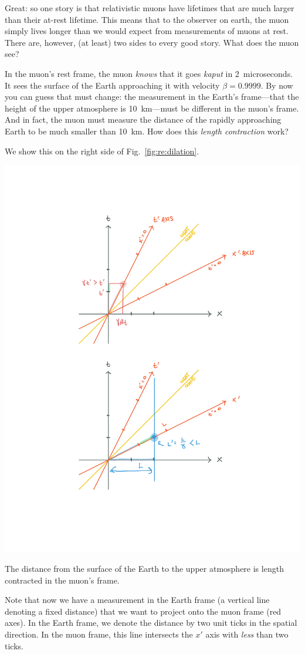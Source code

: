 Great: so one story is that relativistic muons have lifetimes that are much larger than their at-rest lifetime. This means that to the observer on earth, the muon simply lives longer than we would expect from measurements of muons at rest. There are, however, (at least) two sides to every good story. What does the muon see?

In the muon's rest frame, the muon \emph{knows} that it goes \emph{kaput} in 2~microseconds. It sees the surface of the Earth approaching it with velocity $\beta = 0.9999$. By now you can guess that must change: the measurement in the Earth's frame---that the height of the upper atmosphere is 10~km---must be different in the muon's frame. And in fact, the muon must measure the distance of the rapidly approaching Earth to be much smaller than 10~km. How does this \emph{length contraction} work? 

We show this on the right side of Fig.~\ref{fig:re:dilation}.
\begin{marginfigure}
\includegraphics[width=\textwidth]{figures/rel_len_contractino.pdf}
\caption{The distance from the surface of the Earth to the upper atmosphere is length contracted in the muon's frame.
    \label{fig:re:dilation}
}
\end{marginfigure}
Note that now we have a measurement in the Earth frame (a vertical line denoting a fixed distance) that we want to project onto the muon frame (red axes). In the Earth frame, we denote the distance by two unit ticks in the spatial direction. In the muon frame, this line intersects the $x'$ axis with \emph{less} than two ticks.


